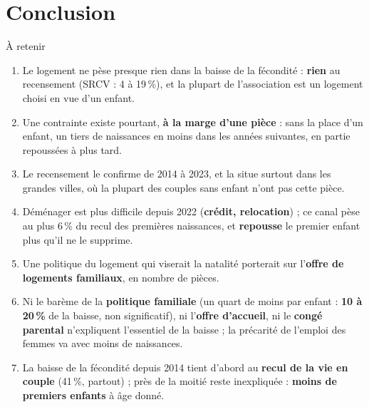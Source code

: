 \documentclass[10pt,aspectratio=169]{beamer}
\begin{document}
\section{Conclusion}

\begin{frame}{À retenir}
  \small
  \begin{enumerate}\setlength{\itemsep}{0.05em}
    \item Le logement ne pèse presque rien dans la baisse de la fécondité : \textbf{rien} au recensement (SRCV : 4 à 19\,\%), et la plupart de l'association est un logement choisi en vue d'un enfant.
    \item Une contrainte existe pourtant, \textbf{à la marge d'une pièce} : sans la place d'un enfant, un tiers de naissances en moins dans les années suivantes, en partie repoussées à plus tard.
    \item Le recensement le confirme de 2014 à 2023, et la situe surtout dans les grandes villes, où la plupart des couples sans enfant n'ont pas cette pièce.
    \item Déménager est plus difficile depuis 2022 (\textbf{crédit, relocation}) ; ce canal pèse au plus 6\,\% du recul des premières naissances, et \textbf{repousse} le premier enfant plus qu'il ne le supprime.
    \item Une politique du logement qui viserait la natalité porterait sur l'\textbf{offre de logements familiaux}, en nombre de pièces.
    \item Ni le barème de la \textbf{politique familiale} (un quart de moins par enfant : \textbf{10 à 20\,\%} de la baisse, non significatif), ni l'\textbf{offre d'accueil}, ni le \textbf{congé parental} n'expliquent l'essentiel de la baisse ; la précarité de l'emploi des femmes va avec moins de naissances.
    \item La baisse de la fécondité depuis 2014 tient d'abord au \textbf{recul de la vie en couple} (41\,\%, partout) ; près de la moitié reste inexpliquée : \textbf{moins de premiers enfants} à âge donné.
  \end{enumerate}
\end{frame}
\end{document}
